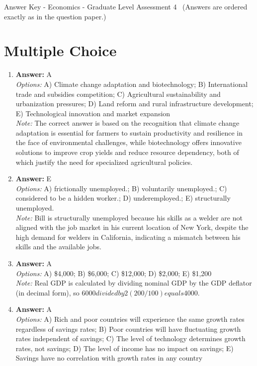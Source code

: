 \documentclass[12pt]{article}
\begin{document}
\begin{center}
Answer Key - Economics - Graduate Level Assessment 4 \
\small (Answers are ordered exactly as in the question paper.)
\end{center}

\section*{Multiple Choice}
\begin{enumerate}[label=\arabic*.]
\item \textbf{Answer:} A
\\ \textit{Options:} A) Climate change adaptation and biotechnology; B) International trade and subsidies competition; C) Agricultural sustainability and urbanization pressures; D) Land reform and rural infrastructure development; E) Technological innovation and market expansion
\\ \textit{Note:} The correct answer is based on the recognition that climate change adaptation is essential for farmers to sustain productivity and resilience in the face of environmental challenges, while biotechnology offers innovative solutions to improve crop yields and reduce resource dependency, both of which justify the need for specialized agricultural policies.
\item \textbf{Answer:} E
\\ \textit{Options:} A) frictionally unemployed.; B) voluntarily unemployed.; C) considered to be a hidden worker.; D) underemployed.; E) structurally unemployed.
\\ \textit{Note:} Bill is structurally unemployed because his skills as a welder are not aligned with the job market in his current location of New York, despite the high demand for welders in California, indicating a mismatch between his skills and the available jobs.
\item \textbf{Answer:} A
\\ \textit{Options:} A) \$4,000; B) \$6,000; C) \$12,000; D) \$2,000; E) \$1,200
\\ \textit{Note:} Real GDP is calculated by dividing nominal GDP by the GDP deflator (in decimal form), so $6000 divided by 2 (200/100) equals $4000.
\item \textbf{Answer:} A
\\ \textit{Options:} A) Rich and poor countries will experience the same growth rates regardless of savings rates; B) Poor countries will have fluctuating growth rates independent of savings; C) The level of technology determines growth rates, not savings; D) The level of income has no impact on savings; E) Savings have no correlation with growth rates in any country

\end{enumerate}
\end{document}
